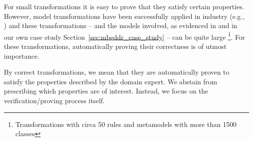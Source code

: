 For small transformations it is easy to prove that they satisfy certain
properties. However, model transformations have been successfully applied in
industry (e.g., \cite{daghsen:hal-00660252,Giese2010}) and these transformations
-- and the models involved, as evidenced in \cite{Selim2012} and in our own case
study Section~\ref{sec:mbeddr_case_study} -- can be quite large
\footnote{Transformations with circa 50 rules and metamodels with more than 1500
classes}.
For these transformations, automatically proving their correctness is of
utmost importance.

By correct transformations, we mean that they are automatically proven to satisfy the properties described by the domain expert. We abstain from prescribing which properties are of interest. Instead, we focus on the verification/proving process itself.



